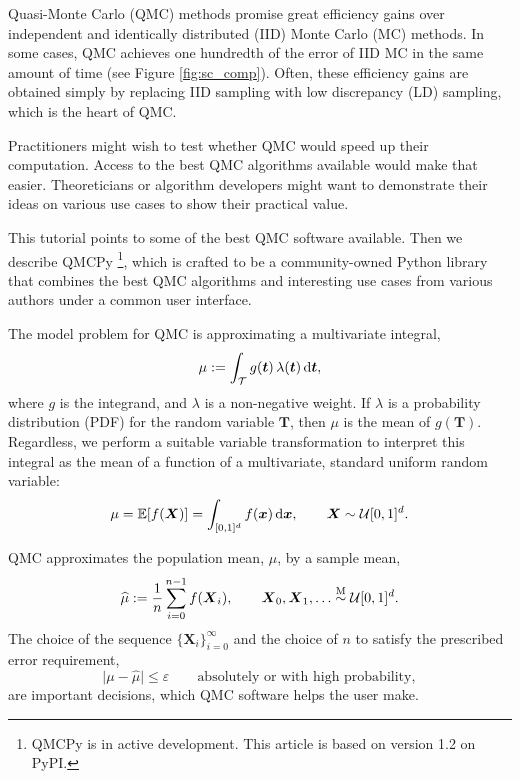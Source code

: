 \documentclass[graybox]{svmult}
\begin{document}
Quasi-Monte Carlo (QMC) methods promise great efficiency gains over independent and identically distributed (IID) Monte Carlo (MC) methods.  In some cases, QMC  achieves one hundredth of the error of IID MC in the same amount of time (see Figure \ref{fig:sc_comp}). Often, these efficiency gains are obtained simply by replacing IID sampling with low discrepancy (LD) sampling, which is the heart of QMC. 

Practitioners might wish to test whether QMC would speed up their computation.  Access to the best QMC algorithms available would make that easier.  Theoreticians or algorithm developers might want to demonstrate their ideas on various use cases to show their practical value.  

This tutorial points to some of the best QMC software available.  Then we describe  QMCPy \cite{QMCPy2020a}\footnote{QMCPy is in active development. This article is based on version 1.2 on PyPI.}, which is crafted to be a community-owned Python library that combines the best QMC algorithms and interesting use cases from various authors under a common user interface.

The model problem for QMC is approximating a multivariate integral,
\begin{equation} \label{eq:integral}
	\mu := \int_\mathcal{T} g(\boldsymbol{t}) \, \lambda(\boldsymbol{t}) \, \D \boldsymbol{t},
\end{equation}
where $g$ is the integrand, and $\lambda$ is a non-negative weight.  If $\lambda$ is a probability distribution (PDF) for the random variable $\boldsymbol{T}$, then $\mu$ is the mean of $g(\boldsymbol{T})$.  Regardless, we perform a suitable variable transformation to interpret this integral as the  mean of a function of a multivariate, standard uniform random variable:
\begin{equation} \label{eq:fintegral}
	\mu = \mathbb{E}[f(\boldsymbol{X})] =  \int_{[0,1]^d}  f(\boldsymbol{x}) \,  \D \boldsymbol{x} , \qquad \boldsymbol{X} \sim \mathcal{U}[0,1]^d.
\end{equation}

QMC approximates the population mean, $\mu$,  by a sample mean,
\begin{equation} \label{eq:samplemean}
	\widehat{\mu} := \frac 1n \sum_{i=0}^{n-1} f(\boldsymbol{X}_i), \qquad \boldsymbol{X}_0, \boldsymbol{X}_1, \ldots \overset{\textup{M}}{\sim} \mathcal{U}[0,1]^d.
\end{equation}
The choice of the sequence $\{\boldsymbol{X}_i\}_{i=0}^\infty$ and the choice of $n$ to satisfy  the prescribed error requirement,
\begin{equation} \label{eq:err_req}
	\lvert\mu - \widehat{\mu}\rvert \le \varepsilon \qquad \text{absolutely or with high probability},
\end{equation} 
are important decisions, which  QMC software helps the user make.
\end{document}
